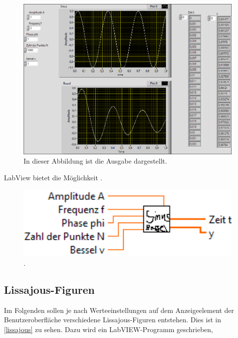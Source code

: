 \documentclass[
a4paper,
12pt,
pagesize,
ngerman
]{scrartcl}
\begin{document}
	\begin{figure}[h]
		\centering
		\includegraphics[width=1.0\textwidth]{EIRE2018Dateien/Tag1/sinusbessel-bilder/SinusBesselp}
		\caption{In dieser Abbildung ist die Ausgabe dargestellt.}
		\label{sinusbesselausgabe}
		\centering
	\end{figure}

	\noindent LabView bietet die Möglichkeit .

	\begin{figure}[h]
		\centering
		\includegraphics[width=1.0\textwidth]{EIRE2018Dateien/Tag1/sinusbessel-bilder/SinusBesselc}
		\caption{.}
	\end{figure}
	
	\subsection{Lissajous-Figuren}
	
	Im Folgenden sollen je nach Werteeinstellungen auf dem Anzeigeelement der Benutzeroberfläche verschiedene Lissajous-Figuren entstehen. Dies ist in \cref{lissajous} zu sehen. Dazu wird ein LabVIEW-Programm geschrieben, 
	
\end{document}
